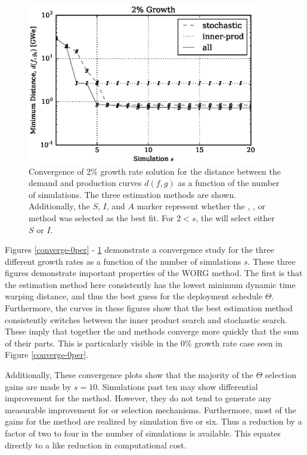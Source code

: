 \begin{figure}[htb]
\centering
\includegraphics[width=0.9\textwidth]{converge-2per.eps}
\caption{Convergence of 2\% growth rate solution for the distance between
the demand and production curves $d(f, g)$ as a function of the number of
simulations. The three estimation methods are shown. Additionally, the
$S$, $I$, and $A$ marker represent whether the \stochastic, \innerprod,
or \allflag method was selected as the best fit. For $2 < s$, the \allflag
will select either $S$ or $I$.
}
\label{converge-2per}
\end{figure}

Figures \ref{converge-0per} - \ref{converge-2per} demonstrate a convergence
study for the three
different growth rates as a function of the number of simulations $s$.
These three figures demonstrate important properties of the WORG method.
The first is that the \allflag estimation method here consistently has
the lowest minimum dynamic time warping distance, and thus the best guess
for the deployment schedule $\Theta$.  Furthermore, the \allflag curves
in these figures show that the best estimation method consistently switches
between the inner product search and stochastic search. These imply
that together the \stochastic and \innerprod methods converge more quickly
that the sum of their parts.  This is particularly visible in the 0\% growth
rate case seen in Figure \ref{converge-0per}.

Additionally, These convergence plots show that the majority of the
$\Theta$ selection gains are made by $s=10$.  Simulations past ten may
show differential improvement for the \allflag method.  However, they
do not tend to generate any measurable improvement for \stochastic or
\innerprod selection mechanisms. Furthermore, most of the gains for the
\allflag method are realized by simulation five or six. Thus a reduction
by a factor of two to four in the number of simulations is available.
This equates directly to a like reduction in computational cost.

